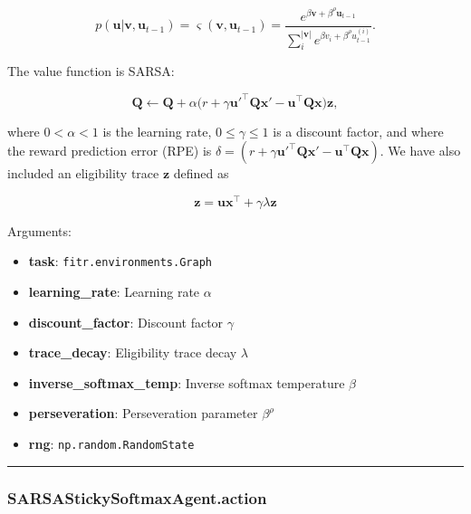 \[
p(\mathbf u|\mathbf v, \mathbf u_{t-1}) = \varsigma(\mathbf v, \mathbf u_{t-1}) = \frac{e^{\beta \mathbf v + \beta^\rho \mathbf u_{t-1}}}{\sum_{i}^{|\mathbf v|} e^{\beta v_i + \beta^\rho u_{t-1}^{(i)}}}.
\]

The value function is SARSA:

\[
\mathbf Q \gets \mathbf Q + \alpha \big(r + \gamma \mathbf u'^\top \mathbf Q \mathbf x' - \mathbf u^\top \mathbf Q \mathbf x \big) \mathbf z,
\]

where \(0 < \alpha < 1\) is the learning rate, \(0 \leq \gamma \leq 1\)
is a discount factor, and where the reward prediction error (RPE) is
\(\delta = (r + \gamma \mathbf u'^\top \mathbf Q \mathbf x' - \mathbf u^\top \mathbf Q \mathbf x)\).
We have also included an eligibility trace \(\mathbf z\) defined as

\[
\mathbf z = \mathbf u \mathbf x^\top +  \gamma \lambda \mathbf z
\]

Arguments:

\begin{itemize}
\tightlist
\item
  \textbf{task}: \texttt{fitr.environments.Graph}
\item
  \textbf{learning\_rate}: Learning rate \(\alpha\)
\item
  \textbf{discount\_factor}: Discount factor \(\gamma\)
\item
  \textbf{trace\_decay}: Eligibility trace decay \(\lambda\)
\item
  \textbf{inverse\_softmax\_temp}: Inverse softmax temperature \(\beta\)
\item
  \textbf{perseveration}: Perseveration parameter \(\beta^\rho\)
\item
  \textbf{rng}: \texttt{np.random.RandomState}
\end{itemize}

\begin{center}\rule{0.5\linewidth}{\linethickness}\end{center}

\subsubsection{SARSAStickySoftmaxAgent.action}\label{sarsastickysoftmaxagent.action}

\begin{Shaded}
\begin{Highlighting}[]
\end{Highlighting}
\end{Shaded}

